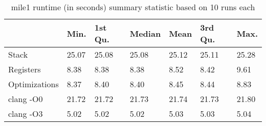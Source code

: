 \begin{table}[h!]
\centering
\begin{tabular}{p{}p{}p{}p{}p{}p{}p{}}
  \hline
 & Min. & 1st Qu. & Median & Mean & 3rd Qu. & Max. \\ 
  \hline
Stack & 25.07 & 25.08 & 25.08 & 25.12 & 25.11 & 25.28 \\ 
  Registers & 8.38 & 8.38 & 8.38 & 8.52 & 8.42 & 9.61 \\ 
  Optimizations & 8.37 & 8.40 & 8.40 & 8.45 & 8.44 & 8.83 \\ 
  clang -O0 & 21.72 & 21.72 & 21.73 & 21.74 & 21.73 & 21.80 \\ 
  clang -O3 & 5.02 & 5.02 & 5.02 & 5.03 & 5.03 & 5.04 \\ 
   \hline
\end{tabular}
\caption{mile1 runtime (in seconds) summary statistic based on 10 runs each}
\end{table}
